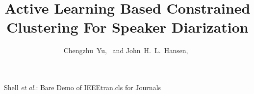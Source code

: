 \documentclass[journal,10pt]{IEEEtran}
\begin{document}
%
\title{Active Learning Based Constrained Clustering For Speaker Diarization}
%
%
%

\author{Chengzhu~Yu,~
        and John~H.~L.~Hansen,~}%

% 
%



{Shell \MakeLowercase{\textit{et al.}}: Bare Demo of IEEEtran.cls for Journals}
% 
\end{document}
